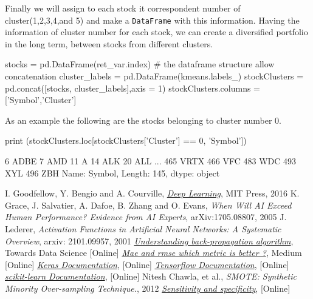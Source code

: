 Finally we will assign to each stock it correspondent number of cluster(1,2,3,4,and 5) and make a \texttt{DataFrame} with this information. Having the information of cluster number for each stock, we can create a diversified portfolio in the long term, between stocks from different clusters.

\begin{ipython} 
stocks = pd.DataFrame(ret_var.index) # the dataframe structure allow concatenation
cluster_labels = pd.DataFrame(kmeans.labels_)
stockClusters = pd.concat([stocks, cluster_labels],axis = 1)
stockClusters.columns = ['Symbol','Cluster']
\end{ipython}
 
As an example the following are the stocks belonging to cluster number 0.

\begin{ipython} 
print (stockClusters.loc[stockClusters['Cluster'] == 0, 'Symbol'])
\end{ipython}
\begin{ioutput}
6      ADBE
7       AMD
11        A
14      ALK
20      ALL
       ... 
465    VRTX
466     VFC
483     WDC
493     XYL
496     ZBH
Name: Symbol, Length: 145, dtype: object
\end{ioutput}
 
\begin{thebibliography}{9}
 I. Goodfellow, Y. Bengio and A. Courville, \href{http://www.deeplearningbook.org}{\emph{Deep Learning}}, MIT Press, 2016
K. Grace, J. Salvatier, A. Dafoe, B. Zhang and O. Evans, \emph{When Will AI Exceed Human Performance? Evidence from AI Experts}, arXiv:1705.08807, 2005
 J. Lederer, \emph{Activation Functions in Artificial Neural Networks: A Systematic Overview}, arxiv: 2101.09957, 2001
\href{https://towardsdatascience.com/understanding-backpropagation-algorithm-7bb3aa2f95fd}{\emph{Understanding back-propagation algorithm}}, Towards Data Science [Online]
\href{https://medium.com/human-in-a-machine-world/mae-and-rmse-which-metric-is-better-e60ac3bde13d}{\emph{Mae and rmse which metric is better ?}}, Medium [Online]
\href{https://keras.io/}{\emph{Keras Documentation}}, [Online]  
\href{https://www.tensorflow.org/}{\emph{Tensorflow Documentation}}, [Online] 
\href{https://scikit-learn.org/stable/}{\emph{scikit-learn Documentation}}, [Online]
Nitesh Chawla, et al., \emph{SMOTE: Synthetic Minority Over-sampling Technique.}, 2012
\href{https://en.wikipedia.org/wiki/Sensitivity_and_specificity}{\emph{Sensitivity and specificity}}, [Online]
\end{thebibliography}